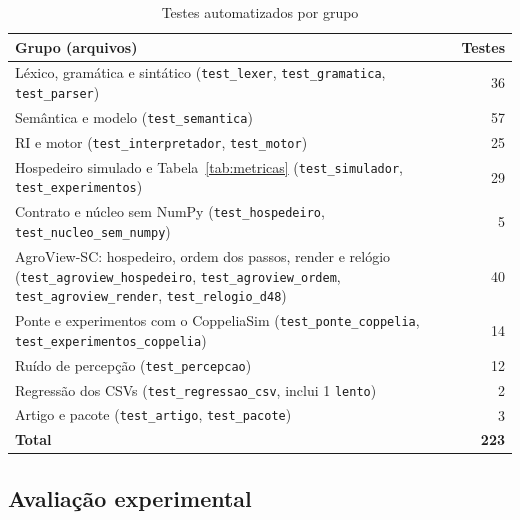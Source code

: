 \documentclass[conference]{IEEEtran}
\begin{document}
\begin{table}[htbp]
\caption{Testes automatizados por grupo}
\label{tab:testes}
\centering
\footnotesize
\setlength{\tabcolsep}{4pt}
\begin{tabularx}{\columnwidth}{@{}L r@{}}
\toprule
\textbf{Grupo (arquivos)} & \textbf{Testes} \\
\midrule
Léxico, gramática e sintático (\texttt{test\_lexer}, \texttt{test\_gramatica},
\texttt{test\_parser}) & 36 \\
Semântica e modelo (\texttt{test\_semantica}) & 57 \\
RI e motor (\texttt{test\_interpretador}, \texttt{test\_motor}) & 25 \\
Hospedeiro simulado e Tabela~\ref{tab:metricas} (\texttt{test\_simulador},
\texttt{test\_experimentos}) & 29 \\
Contrato e núcleo sem NumPy (\texttt{test\_hospedeiro},
\texttt{test\_nucleo\_sem\_numpy}) & 5 \\
AgroView-SC: hospedeiro, ordem dos passos, render e relógio
(\texttt{test\_agroview\_hospedeiro}, \texttt{test\_agroview\_ordem},
\texttt{test\_agroview\_render}, \texttt{test\_relogio\_d48}) & 40 \\
Ponte e experimentos com o CoppeliaSim (\texttt{test\_ponte\_coppelia},
\texttt{test\_experimentos\_coppelia}) & 14 \\
Ruído de percepção (\texttt{test\_percepcao}) & 12 \\
Regressão dos CSVs (\texttt{test\_regressao\_csv}, inclui 1 \texttt{lento}) & 2 \\
Artigo e pacote (\texttt{test\_artigo}, \texttt{test\_pacote}) & 3 \\
\midrule
\textbf{Total} & \textbf{223} \\
\bottomrule
\end{tabularx}
\end{table}

\subsection{Avaliação experimental}
\label{sec:avaliacao}
\end{document}
